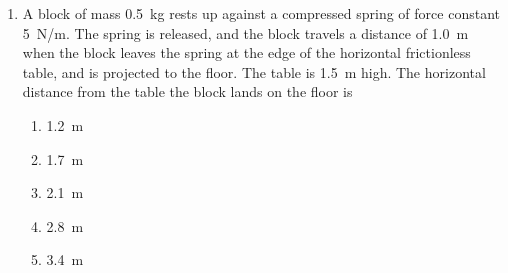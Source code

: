 \documentclass{../../oss-apphys}
\begin{document}
\begin{multicols}{2}
\begin{enumerate}[leftmargin=18pt,start=8]
  \item A block of mass \SI{0.5}{kg} rests up against a compressed spring of
    force constant \SI{5}{N/m}. The spring is released, and the block travels a
    distance of \SI{1.0}{m} when the block leaves the spring at the edge of the
    horizontal frictionless table, and is projected to the floor. The table is
    \SI{1.5}{m} high. The horizontal distance from the table the block lands on
    the floor is
    \begin{center}
    \end{center}
    \begin{enumerate}[noitemsep,topsep=0pt]
    \item\SI{1.2}{\metre}
    \item\SI{1.7}{\metre}
    \item\SI{2.1}{\metre}
    \item\SI{2.8}{\metre}
    \item\SI{3.4}{\metre}
    \end{enumerate}
%
%
%
%
%

\end{enumerate}
\end{multicols}
\end{document}
